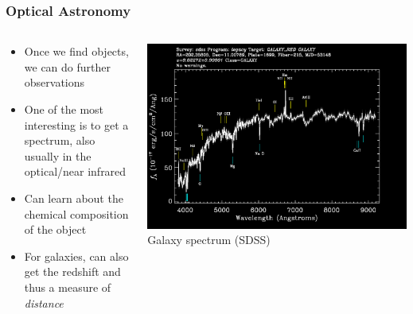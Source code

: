 \documentclass{beamer}
\begin{document}
\frame
{

    \frametitle{Optical Astronomy}


    \begin{columns}
        \begin{column}{0.5\textwidth}
            \begin{itemize}

                \item Once we find objects, we can do further observations

                \item One of the most interesting is to get a spectrum, also
                    usually in the optical/near infrared

                \item Can learn about the chemical composition of the object

                \item For galaxies, can also get the redshift and thus
                    a measure of {\em distance}

            \end{itemize}
        \end{column}
        \begin{column}{0.5\textwidth}
            \begin{center}
                \includegraphics[width=\textwidth]{specById-inv.png}
                \newline
                {\tiny Galaxy spectrum (SDSS)}
            \end{center}

            
        \end{column}
    \end{columns}


}
\end{document}
